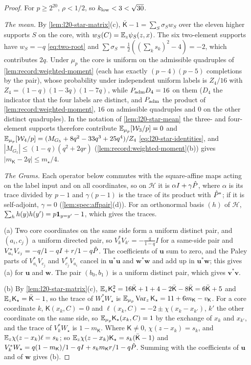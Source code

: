 \begin{proof}
For $p\ge2^{20}$, $\rho<1/2$, so $k_{\rm low}<3<\sqrt{30}$.

\emph{The mean.} By \cref{lem:l20-star-matrix}(c),
$\bar{\mathsf K}-1=\sum_S\sigma_Sw_S$ over the eleven higher supports $S$ on the
core, with $w_S(C)=\mathbb E_z\psi_S(z,x)$. The six two-element supports have
$w_S=-q$ \eqref{eq:two-root} and $\sum\sigma_S=\frac12((\sum_ks_k)^2-4)=-2$,
which contributes $2q$. Under $\mu_p$ the core is uniform on the admissible
quadruples of \cref{lem:record:weighted-moment} (each has exactly $(p-4)(p-5)$
completions by the pair), whose probability under independent uniform labels
is $Z_4/16$ with $Z_4=(1-q)(1-3q)(1-7q)$, while $P_{\rm adm}D_4=16$ on
them ($D_4$ the indicator that the four labels are distinct, and $P_{\rm adm}$
the product of \cref{lem:record:weighted-moment}, $16$ on admissible
quadruples and $0$ on the other distinct quadruples). In the notation of
\cref{lem:l20-star-mean} the three- and four-element supports therefore
contribute $\mathbb E_{\mu_p}[\mathcal W_3/p]=0$ and
$\mathbb E_{\mu_p}[\mathcal W_4/p]=(M_{G_5}+8q^2-33q^3+25q^4)/Z_4$
\eqref{eq:l20-star-identities}, and $|M_{G_5}|\le(1-q)(q^2+2qr)$
(\cref{lem:record:weighted-moment}(b)) gives $|m_{\mathsf K}-2q|\le m_\star/4$.

\emph{The Grams.} Each operator below commutes with the square-affine maps
acting on the label input and on all coordinates, so on $\mathcal H$ it is
$\alpha I+\gamma\hat P$, where $\alpha$ is its trace divided by $p-1$ and
$\gamma(p-1)$ is the trace of its product with $\hat P^*$; if it is
self-adjoint, $\gamma=0$ (\cref{lem:spec:affpair}(d)). For an orthonormal basis
$(h)$ of $\mathcal H$, $\sum_hh(y)h(y')=p\mathbf 1_{y=y'}-1$, which gives the traces.

(a) Two core coordinates on the same side form a uniform distinct pair, and
$(a_i,c_j)$ a uniform directed pair, so $V_k^*V_{k'}=-\frac q{1-q}I$ for a
same-side pair and $V_{a_i}^*V_{c_j}=-q/1-qI+r/1-q\hat P$. The
coefficients of $\mathbf u$ sum to zero, and the Paley parts of
$V_{a_i}^*V_{c_j}$ and $V_{c_j}^*V_{a_i}$ cancel in $\mathbf u^*\mathbf u$ and
$\mathbf w^*\mathbf w$ and add up in $\mathbf u^*\mathbf w$; this gives (a) for
$\mathbf u$ and $\mathbf w$. The pair $(b_0,b_1)$ is a uniform distinct pair,
which gives $\mathbf v^*\mathbf v$.

(b) By \cref{lem:l20-star-matrix}(c),
$\mathbb E_z\mathsf K_\star^2=16\bar{\mathsf K}+1+4-2\bar{\mathsf K}-8\bar{\mathsf K}
=6\bar{\mathsf K}+5$ and $\mathbb E_z\mathsf K_\star=\bar{\mathsf K}-1$, so the trace of
$W_\star^*W_\star$ is $\mathbb E_{\mu_p}\operatorname{Var}_z\mathsf K_\star=11+6m_{\mathsf K}-v_{\mathsf K}$.
For a core coordinate $k$, $\mathsf K(x_k,C)=0$ and
$\ell(x_k,C)=-2\pm\chi(x_k-x_{k'})$, $k'$ the other coordinate on the same side,
so $\mathbb E_{\mu_p}\mathsf K_\star(x_k,C)=1$ by the exchange of $x_k$ and $x_{k'}$, and
the trace of $V_k^*W_\star$ is $1-m_{\mathsf K}$. Where $\mathsf K\ne0$,
$\chi(z-x_k)=s_k$, and $\mathbb E_z\chi(z-x_k)\ell=s_k$; so
$\mathbb E_z\chi(z-x_k)\mathsf K_\star=s_k(\bar{\mathsf K}-1)$ and
$V_k^*W_\star=q(1-m_{\mathsf K})/1-qI+s_km_{\mathsf K}r/1-q\hat P$.
Summing with the coefficients of $\mathbf u$ and of $\mathbf w$ gives (b).


\end{proof}

